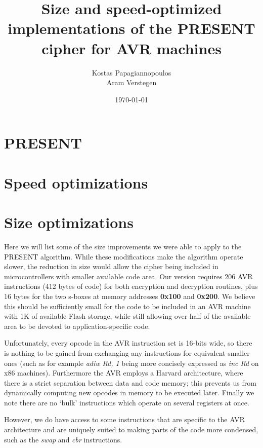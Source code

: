 \documentclass{article}
\begin{document}
\title{Size and speed-optimized implementations of the PRESENT cipher for AVR machines}
\author{
Kostas Papagiannopoulos \\
Aram Verstegen
}
\date{\today}

\maketitle

\abstract{}

\section{PRESENT}
\section{Speed optimizations}
\section{Size optimizations}

Here we will list some of the size improvements we were able to apply to the PRESENT algorithm.
While these modifications make the algorithm operate slower, the reduction in size would allow the cipher being included in microcontrollers with smaller available code area.
Our version requires 206 AVR instructions (412 bytes of code) for both encryption and decryption routines, plus 16 bytes for the two s-boxes at memory addresses \textbf{0x100} and \textbf{0x200}.
We believe this should be sufficiently small for the code to be included in an AVR machine with 1K of available Flash storage, while still allowing over half of the available area to be devoted to application-specific code.

Unfortunately, every opcode in the AVR instruction set is 16-bits wide, so there is nothing to be gained from exchanging any instructions for equivalent smaller ones (such as for example \textit{adiw Rd, 1} being more concisely expressed as \textit{inc Rd} on x86 machines).
Furthermore the AVR employs a Harvard architecture, where there is a strict separation between data and code memory; this prevents us from dynamically computing new opcodes in memory to be executed later.
Finally we note there are no `bulk' instructions which operate on several registers at once.

However, we do have access to some instructions that are specific to the AVR architecture and are uniquely suited to making parts of the code more condensed, such as the \textit{swap} and \textit{cbr} instructions.
\end{document}
